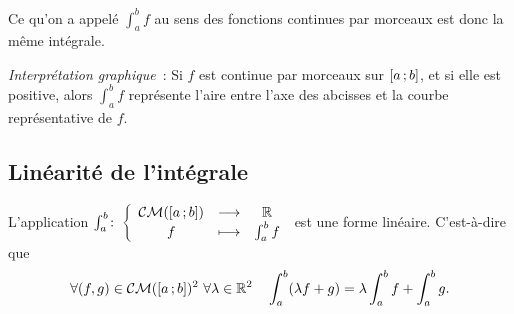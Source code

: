 Ce qu'on a appelé $\int_a^b f$ au sens des fonctions continues par morceaux est donc la même intégrale.

\emph{Interprétation graphique}~: Si $f$ est continue par morceaux sur $\left[ a \, ;  b \right]$, et si elle est positive, alors $\int_a^b f$ représente l'aire entre l'axe des abcisses et la courbe représentative de $f$.

\subsection{Linéarité de l'intégrale}

\begin{theo}
  L'application $\int_a^b\colon \left\{\begin{array}{ccc} \mathcal{CM}(\left[ a \, ;  b \right]) & \longrightarrow &\mathbb{R}\\ f & \longmapsto & \int_a^b f \end{array} \right.$ est une forme linéaire. C'est-à-dire que
  \begin{equation}
    \forall (f,g) \in \CM(\intervalleff{a}{b})^2 \ \forall \lambda \in \R^2 \quad \int_a^b (\lambda f+g) = \lambda \int_a^b f + \int_a^b g.
  \end{equation}
\end{theo}
